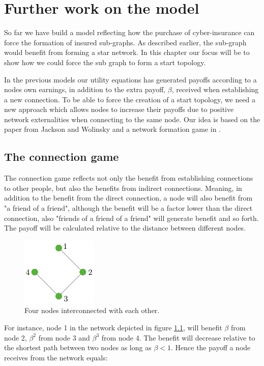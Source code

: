 \chapter{Further work on the model}
\label{secondPhaseOfModelingCyberInsurance} 

So far we have build a model reflecting how the purchase of cyber-insurance can force the formation of insured sub-graphs. As described earlier, the sub-graph would benefit from forming a star network. In this chapter our focus will be to show how we could force the sub graph to form a start topology. 

In the previous models our utility equations has generated payoffs according to a nodes own earnings, in addition to the extra payoff, $\beta$, received when establishing a new connection. To be able to force the creation of a start topology, we need a new approach which allows nodes to increase their payoffs due to positive network externalities when connecting to the same node. Our idea is based on the paper from Jackson and Wolinsky \cite{jackson1996strategic} and a network formation game in \cite{jackson2005survey}. 

\section{The connection game}
The connection game reflects not only the benefit from establishing connections to other people, but also the benefits from indirect connections. Meaning, in addition to the benefit from the direct connection, a node will also benefit from "a friend of a friend", although the benefit will be a factor lower than the direct connection, also "friends of a friend of a friend" will generate benefit and so forth. The payoff will be calculated relative to the distance between different nodes.


\begin{figure}[h]
\centering
  \includegraphics[width=0.2\linewidth]{../Figures/connectionGame.png}
  \caption{\label{fig:connectionGame} Four nodes interconnected with each other.}
\end{figure}
For instance, node 1 in the network depicted in figure \ref{fig:connectionGame}, will benefit $\beta$ from node 2, $\beta^{2}$ from node 3 and $\beta^{3}$ from node 4. The benefit will decrease relative to the shortest path between two nodes as long as $\beta < 1$. Hence the payoff a node receives from the network equals: 

